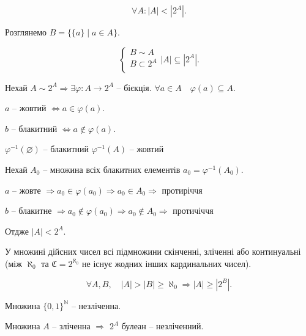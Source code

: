 \begin{theorem}
    $$\forall A: |A| < |2^{A}|.$$
\end{theorem}


Розглянемо $B =\{ \{a\} \mid a \in A \}$.

$$\left\{ \begin{array}{l}
    B \sim A \\
    B \subset 2^{A} \\
\end{array} \right. |A| \subseteq |2^{A}|.$$

Нехай $A \sim 2^{A} \Rightarrow \exists \varphi: A \rightarrow 2^{A}$ -- бієкція.
$\forall a \in A \quad \varphi(a) \subseteq A$.

$a$ -- жовтий $\Leftrightarrow a \in \varphi(a)$.

$b$ -- блакитний $\Leftrightarrow a \notin \varphi(a)$.

$\varphi^{-1}(\varnothing)$ -- блакитний
$\varphi^{-1}(A)$ -- жовтий

Нехай $A_0$ -- множина всіх блакитних елементів
$a_0 = \varphi^{-1}(A_0)$.

$a$ -- жовте $\Rightarrow a_0 \in \varphi(a_0) \Rightarrow a_0 \in A_0 \Rightarrow$
протиріччя

$b$ -- блакитне  $\Rightarrow a_0 \notin \varphi(a_0) \Rightarrow a_0 \notin A_0 \Rightarrow$
протичіччя

Отдже $|A| < 2^A$.


\begin{hypothesis}
    У множині дійсних чисел
    всі підмножини скінченні, зліченні або континуальні
    (між $\aleph_0$ та $\mathfrak{C} = 2^{\aleph_0}$ не існує жодних інших кардинальних чисел).
\end{hypothesis}

\begin{hypothesis}
    $$\forall A, B, \quad |A| > |B| \geqslant \aleph_0 \Rightarrow |A| \geqslant |2^B|.$$
\end{hypothesis}


\begin{theorem}[Теорема К1]
    Множина $\{0, 1\}^{\mathbb{N}}$ -- незліченна.
\end{theorem}

\begin{theorem}[Теорема К1.5]
    Множина $A$ -- зліченна $\Rightarrow$ $2^A$ булеан -- незліченний.
\end{theorem}


